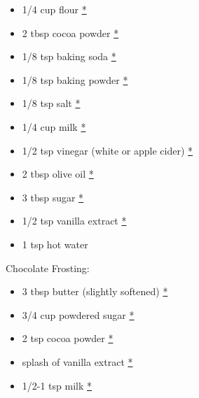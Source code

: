 \documentclass[
]{book}
\providecommand{\tightlist}{%
  \setlength{\itemsep}{0pt}\setlength{\parskip}{0pt}}
\begin{document}
\begin{itemize}
\tightlist
\item
  1/4 cup flour
  \href{https://www.publix.com/pd/publix-all-purpose-flour/RIO-PCI-104014?origin=search1}{*}
\item
  2 tbsp cocoa powder
  \href{https://www.publix.com/pd/hersheys-dutched-cocoa-special-dark/RIO-PCI-102330?origin=search1}{*}
\item
  1/8 tsp baking soda
  \href{https://www.publix.com/pd/arm-and-hammer-baking-soda-pure/RIO-PCI-102907?origin=search1}{*}
\item
  1/8 tsp baking powder
  \href{https://www.publix.com/pd/rumford-baking-powder/RIO-PCI-102919?origin=search1}{*}
\item
  1/8 tsp salt
  \href{https://www.publix.com/pd/morton-salt/RIO-PCI-103677?origin=search9}{*}
\item
  1/4 cup milk
  \href{https://www.publix.com/pd/publix-milk-whole/RIO-PCI-120772?origin=search3}{*}
\item
  1/2 tsp vinegar (white or apple cider)
  \href{https://www.publix.com/pd/publix-vinegar-white-distilled/RIO-PCI-105146?origin=search3}{*}
\item
  2 tbsp olive oil
  \href{https://www.publix.com/pd/publix-olive-oil-extra-virgin/RIO-PCI-103897?origin=search1}{*}
\item
  3 tbsp sugar
  \href{https://www.publix.com/pd/publix-sugar-pure-granulated-extra-fine/RIO-PCI-143101?origin=search1}{*}
\item
  1/2 tsp vanilla extract
  \href{https://www.publix.com/pd/publix-vanilla-extract/RIO-PCI-110432?origin=search1}{*}
\item
  1 tsp hot water
\end{itemize}

Chocolate Frosting:

\begin{itemize}
\tightlist
\item
  3 tbsp butter (slightly softened)
  \href{https://www.publix.com/pd/land-o-lakes-unsalted-butter-made-with-sweet-cream/RIO-PCI-112513?origin=search2}{*}
\item
  3/4 cup powdered sugar
  \href{https://www.publix.com/pd/publix-powdered-sugar-confectioners/RIO-PCI-127078?origin=search1}{*}
\item
  2 tsp cocoa powder
  \href{https://www.publix.com/pd/hersheys-dutched-cocoa-special-dark/RIO-PCI-102330?origin=search1}{*}
\item
  splash of vanilla extract
  \href{https://www.publix.com/pd/publix-vanilla-extract/RIO-PCI-110432?origin=search1}{*}
\item
  1/2-1 tsp milk
  \href{https://www.publix.com/pd/publix-milk-whole/RIO-PCI-120772?origin=search3}{*}
\end{itemize}
\end{document}
